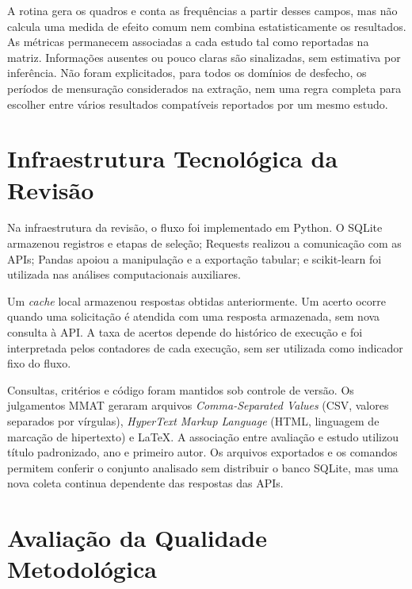 A rotina  gera os quadros e conta as frequências a partir desses campos, mas não calcula uma medida de efeito comum nem combina estatisticamente os resultados. As métricas permanecem associadas a cada estudo tal como reportadas na matriz. Informações ausentes ou pouco claras são sinalizadas, sem estimativa por inferência. Não foram explicitados, para todos os domínios de desfecho, os períodos de mensuração considerados na extração, nem uma regra completa para escolher entre vários resultados compatíveis reportados por um mesmo estudo.

\section{Infraestrutura Tecnológica da Revisão}

Na infraestrutura da revisão, o fluxo foi implementado em Python. O SQLite armazenou registros e etapas de seleção; Requests realizou a comunicação com as APIs; Pandas apoiou a manipulação e a exportação tabular; e scikit-learn foi utilizada nas análises computacionais auxiliares.

Um \textit{cache} local armazenou respostas obtidas anteriormente. Um acerto ocorre quando uma solicitação é atendida com uma resposta armazenada, sem nova consulta à API. A taxa de acertos depende do histórico de execução e foi interpretada pelos contadores de cada execução, sem ser utilizada como indicador fixo do fluxo.

Consultas, critérios e código foram mantidos sob controle de versão. Os julgamentos MMAT geraram arquivos \textit{Comma-Separated Values} (CSV, valores separados por vírgulas), \textit{HyperText Markup Language} (HTML, linguagem de marcação de hipertexto) e \LaTeX. A associação entre avaliação e estudo utilizou título padronizado, ano e primeiro autor. Os arquivos exportados e os comandos permitem conferir o conjunto analisado sem distribuir o banco SQLite, mas uma nova coleta continua dependente das respostas das APIs.

\section{Avaliação da Qualidade Metodológica}
\label{sec:avaliacao-qualidade}

